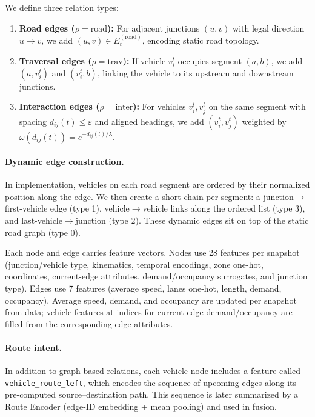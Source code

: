 
We define three relation types:
\begin{enumerate}
    \item \textbf{Road edges ($\rho=\text{road}$):} For adjacent junctions $(u,v)$ with legal direction $u\!\to\!v$, we add $(u,v)\in E_t^{(\text{road})}$, encoding static road topology.
    \item \textbf{Traversal edges ($\rho=\text{trav}$):} If vehicle $v_i^t$ occupies segment $(a,b)$, we add $(a,v_i^t)$ and $(v_i^t,b)$, linking the vehicle to its upstream and downstream junctions.
    \item \textbf{Interaction edges ($\rho=\text{inter}$):} For vehicles $v_i^t,v_j^t$ on the same segment with spacing $d_{ij}(t)\le\varepsilon$ and aligned headings, we add $(v_i^t,v_j^t)$ weighted by $\omega(d_{ij}(t)) = e^{-d_{ij}(t)/\lambda}$.
\end{enumerate}

\paragraph{Dynamic edge construction.}
In implementation, vehicles on each road segment are ordered by their normalized position along the edge. We then create a short chain per segment: a junction$\to$first-vehicle edge (type 1), vehicle$\to$vehicle links along the ordered list (type 3), and last-vehicle$\to$junction (type 2). These dynamic edges sit on top of the static road graph (type 0).

Each node and edge carries feature vectors. Nodes use 28 features per snapshot (junction/vehicle type, kinematics, temporal encodings, zone one-hot, coordinates, current-edge attributes, demand/occupancy surrogates, and junction type). Edges use 7 features (average speed, lanes one-hot, length, demand, occupancy). Average speed, demand, and occupancy are updated per snapshot from data; vehicle features at indices for current-edge demand/occupancy are filled from the corresponding edge attributes.

\paragraph{Route intent.}
In addition to graph-based relations, each vehicle node includes a feature called \texttt{vehicle\_route\_left}, which encodes the sequence of upcoming edges along its pre-computed source--destination path. This sequence is later summarized by a Route Encoder (edge-ID embedding + mean pooling) and used in fusion.

